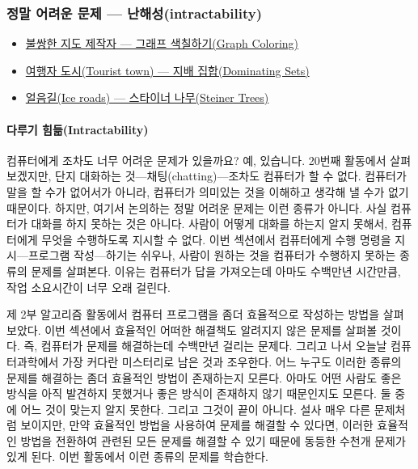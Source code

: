 \documentclass[]{article}
\begin{document}
\subsubsection{정말 어려운 문제 ---
난해성(intractability)}\label{mdash-intractability}

\begin{itemize}
\itemsep1pt\parskip0pt
\item
  \href{csunplugged/04-part/14-graph-coloring.html}{불쌍한 지도 제작자
  --- 그래프 색칠하기(Graph Coloring)}
\item
  \href{csunplugged/04-part/15-dominating-sets.html}{여행자 도시(Tourist
  town) --- 지배 집합(Dominating Sets)}
\item
  \href{csunplugged/04-part/16-Steiner\%20trees.html}{얼음길(Ice roads)
  --- 스타이너 나무(Steiner Trees)}
\end{itemize}

\mbox{}\paragraph{다루기 힘듦(Intractability)}\label{intractability}

컴퓨터에게 조차도 너무 어려운 문제가 있을까요? 예, 있습니다. 20번째
활동에서 살펴보겠지만, 단지 대화하는 것---채팅(chatting)---조차도
컴퓨터가 할 수 없다. 컴퓨터가 말을 할 수가 없어서가 아니라, 컴퓨터가
의미있는 것을 이해하고 생각해 낼 수가 없기 때문이다. 하지만, 여기서
논의하는 정말 어려운 문제는 이런 종류가 아니다. 사실 컴퓨터가 대화를
하지 못하는 것은 아니다. 사람이 어떻게 대화를 하는지 알지 못해서,
컴퓨터에게 무엇을 수행하도록 지시할 수 없다. 이번 섹션에서 컴퓨터에게
수행 명령을 지시---프로그램 작성---하기는 쉬우나, 사람이 원하는 것을
컴퓨터가 수행하지 못하는 종류의 문제를 살펴본다. 이유는 컴퓨터가 답을
가져오는데 아마도 수백만년 시간만큼, 작업 소요시간이 너무 오래 걸린다.

제 2부 알고리즘 활동에서 컴퓨터 프로그램을 좀더 효율적으로 작성하는
방법을 살펴보았다. 이번 섹션에서 효율적인 어떠한 해결책도 알려지지 않은
문제를 살펴볼 것이다. 즉, 컴퓨터가 문제를 해결하는데 수백만년 걸리는
문제다. 그리고 나서 오늘날 컴퓨터과학에서 가장 커다란 미스터리로 남은
것과 조우한다. 어느 누구도 이러한 종류의 문제를 해결하는 좀더 효율적인
방법이 존재하는지 모른다. 아마도 어떤 사람도 좋은 방식을 아직 발견하지
못했거나 좋은 방식이 존재하지 않기 때문인지도 모른다. 둘 중에 어느 것이
맞는지 알지 못한다. 그리고 그것이 끝이 아니다. 설사 매우 다른 문제처럼
보이지만, 만약 효율적인 방법을 사용하여 문제를 해결할 수 있다면, 이러한
효율적인 방법을 전환하여 관련된 모든 문제를 해결할 수 있기 때문에 동등한
수천개 문제가 있게 된다. 이번 활동에서 이런 종류의 문제를 학습한다.
\end{document}
